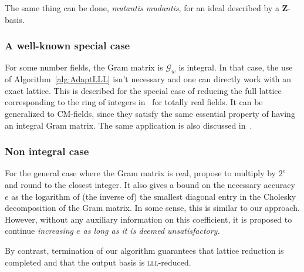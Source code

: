 \documentclass{amsart}
\newcommand{\LLL}{\mbox{\textsc{lll}}}
\newcommand{\Gram}{\mathcal{G}}
\newcommand{\ZZ}{\mathbf{Z}}
\theoremstyle{definition}
\begin{document}
The same thing can be done, {\it mutantis mudantis}, for an ideal
described by a $\ZZ$-basis.

\subsubsection*{A well-known special case} For some number fields, the
Gram matrix is $\Gram_w$ is integral. In that case, the use of
Algorithm~\ref{alg:AdaptLLL} isn't necessary and one can directly work
with an exact lattice. This is described for the special case of
reducing the full lattice corresponding to the ring of integers
in~\cite[Section 4.2]{Belabas04} for totally real fields. It can be
generalized to CM-fields, since they satisfy the same essential
property of having an integral Gram matrix. The same application is
also discussed in~\cite[Section 4.4.2]{Cohen93}.

\subsubsection*{Non integral case}
For the general case where the Gram matrix is real, \cite{Belabas04}
propose to multiply by $2^e$ and round to the closest integer. It also
gives a bound on the necessary accuracy $e$  as the logarithm of (the
inverse of) the smallest diagonal entry in the Cholesky
decomposition of the Gram matrix. In some sense, this is similar to
our approach. However, without any auxiliary information on this
coefficient, it is proposed to continue {\it increasing $e$
as long as it is deemed unsatisfactory.}

By contrast, termination of our algorithm guarantees that lattice
reduction is completed and that the output basis is \LLL-reduced.


 
\end{document}
